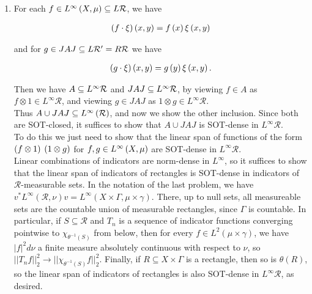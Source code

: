 \documentclass[a4paper,10pt]{report}
\newcommand{\norm}[1]{||#1||}
\begin{document}
\begin{enumerate}
              \item For each $f \in L^\infty \left( X , \mu \right) \subseteq L \mathcal R$, we have

                \begin{align*}
                  \left( f \cdot \xi \right) \left( x , y \right) = f \left( x \right) \xi \left( x , y \right)
                \end{align*}

                and for $g \in J A J \subseteq L \mathcal R' = R \mathcal R$ we have

                \begin{align*}
                  \left( g \cdot \xi \right) \left( x , y \right) = g \left( y \right) \xi \left( x , y \right).
                \end{align*}

                Then we have $A \subseteq L^\infty \mathcal R$ and $J A J \subseteq L^\infty \mathcal R$, by viewing $f \in A$ as $f \otimes 1 \in L^\infty \mathcal R$, and viewing $g \in J A J$ as $1 \otimes g \in L^\infty \mathcal R$.\\
                Thus $A \cup J A J \subseteq L^\infty \left( \mathcal R \right)$, and now we show the other inclusion. Since both are SOT-closed, it suffices to show that $A \cup J A J$ is SOT-dense in $L^\infty \mathcal R$.\\
                To do this we just need to show that the linear span of functions of the form $\left( f \otimes 1 \right)$ $\left( 1 \otimes g \right)$ for $f , g \in L^\infty \left( X , \mu \right)$ are SOT-dense in $L^\infty \mathcal R$.\\
                Linear combinations of indicators are norm-dense in $L^\infty$, so it suffices to show that the linear span of indicators of rectangles is SOT-dense in indicators of $\mathcal R$-measurable sets. 
																In the notation of the last problem, we have $v^*L^\infty(\mathcal{R},\nu)v=L^\infty(X\times\Gamma,\mu\times\gamma)$. There, up to null sets, all measureable sets are the countable union of measurable rectangles, since $\Gamma$ is countable. In particular, if $S\subseteq\mathcal{R}$ and $T_n$ is a sequence of indicator functions converging pointwise to $\chi_{\theta^{-1}(S)}$ from below, then for every $f\in L^2(\mu\times\gamma)$, we have $|f|^2d\nu$ a finite measure absolutely continuous with respect to $\nu$, so $\norm{T_nf}_2^2\to\norm{\chi_{\theta^{-1}(S)}f}_2^2$. Finally, if $R\subseteq X\times\Gamma$ is a rectangle, then so is $\theta(R)$, so the linear span of indicators of rectangles is also SOT-dense in $L^\infty\mathcal{R}$, as desired. 
\end{enumerate}
\end{document}
